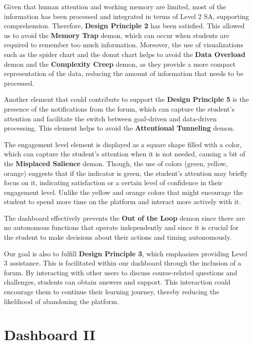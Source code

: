 Given that human attention and working memory are limited, most of the information has been processed and integrated in terms of Level 2 SA, supporting comprehension. Therefore, \textbf{Design Principle 2} has been satisfied.
This allowed us to avoid the \textbf{Memory Trap} demon, which can occur when students are required to remember too much information. 
Moreover, the use of visualizations such as the spider chart and the donut chart helps to avoid the \textbf{Data Overload} demon and the \textbf{Complexity Creep} demon, as they provide a more compact representation of the data, reducing the amount of information that needs to be processed.

Another element that could contribute to support the \textbf{Design Principle 5} is the presence of the notifications from the forum, which can capture the student's attention and facilitate the switch between goal-driven and data-driven processing. This element helps to avoid the \textbf{Attentional Tunneling} demon.

The engagement level element is displayed as a square shape filled with a color, which can capture the student's attention when it is not needed, causing a bit of the \textbf{Misplaced Salience} demon. 
Though, the use of colors (green, yellow, orange) suggests that if the indicator is green, the student's attention may briefly focus on it, indicating satisfaction or a certain level of confidence in their engagement level. Unlike the yellow and orange colors that might encourage the student to spend more time on the platform and interact more actively with it.

The dashboard effectively prevents the \textbf{Out of the Loop} demon since there are no autonomous functions that operate independently and since it is crucial for the student to make decisions about their actions and timing autonomously.

Our goal is also to fulfill \textbf{Design Principle 3}, which emphasizes providing Level 3 assistance. 
This is facilitated within our dashboard through the inclusion of a forum. By interacting with other users to discuss course-related 
questions and challenges, students can obtain answers and support. This interaction could encourage them to continue their learning journey, 
thereby reducing the likelihood of abandoning the platform. 

\section{Dashboard II}


